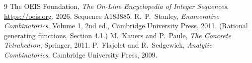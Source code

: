 \documentclass[11pt,a4paper]{article}
\theoremstyle{plain}
\theoremstyle{definition}
\begin{document}
\begin{thebibliography}{9}
 The OEIS Foundation, \emph{The On-Line Encyclopedia of Integer
Sequences}, \url{https://oeis.org}, 2026. Sequence A183885.
 R.~P.~Stanley, \emph{Enumerative Combinatorics}, Volume 1, 2nd ed.,
Cambridge University Press, 2011. (Rational generating functions, Section 4.1.)
 M.~Kauers and P.~Paule, \emph{The Concrete Tetrahedron}, Springer, 2011.
 P.~Flajolet and R.~Sedgewick, \emph{Analytic Combinatorics}, Cambridge
University Press, 2009.
\end{thebibliography}
\end{document}
